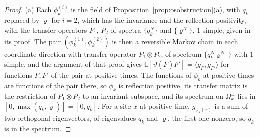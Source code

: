\documentclass[aps,prd,twocolumn,superscriptaddress,nofootinbib,longbibliography,floatfix,amsmath,amssymb,10pt]{revtex4-2}
\theoremstyle{definition}
\theoremstyle{remark}
\newcommand{\E}{\mathbb{E}}
\newcommand{\ip}[2]{\langle #1,#2\rangle}
\begin{document}
\begin{proof}
(a) Each $\phi^{(i)}_k$ is the field of
Proposition~\ref{prop:osobstruction}(a), with $q_k$ replaced by $\varrho$
for $i=2$, which has the invariance and the
reflection positivity, with the transfer operators $P_1$, $P_2$ of spectra
$\{q_k^N\}$ and $\{\varrho^N\}$, $1$ simple, given in its proof. The pair
$(\phi^{(1)}_k,\phi^{(2)}_k)$ is then a reversible Markov chain in each
coordinate direction with transfer operator $P_1\otimes P_2$, of spectrum
$\{q_k^N\varrho^{N'}\}$ with $1$ simple, and the argument of that proof gives
$\E[\vartheta(\bar F)F']=\ip{g_F}{g_{F'}}$ for functions $F,F'$ of the pair
at positive times. The functions of $\phi_k$ at positive times are functions
of the pair there, so $\phi_k$ is reflection positive, its transfer matrix
is the restriction of $P_1\otimes P_2$ to an invariant subspace, and its
spectrum on $\Omega_k^\perp$ lies in $[0,\max(q_k,\varrho)]=[0,q_k]$. For a site
$x$ at positive time, $g_{\phi_k(x)}$ is a sum of two orthogonal
eigenvectors, of eigenvalues $q_k$ and $\varrho$, the first one nonzero, so $q_k$
is in the spectrum.


\end{proof}
\end{document}
